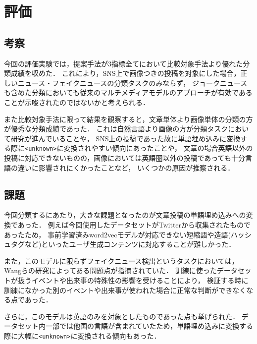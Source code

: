 \chapter{評価}

\section{考察}
今回の評価実験では，提案手法が3指標全てにおいて比較対象手法より優れた分類成績を収めた．
これにより，SNS上で画像つきの投稿を対象にした場合，正しいニュース・フェイクニュースの分類タスクのみならず，
ジョークニュースも含めた分類においても従来のマルチメディアモデルのアプローチが有効であることが示唆されたのではないかと考えられる．

また比較対象手法に限って結果を観察すると，文章単体より画像単体の分類の方が優秀な分類成績であった．
これは自然言語より画像の方が分類タスクにおいて研究が進んでいることや，
SNS上の投稿であった故に単語埋め込みに変換する際に\texttt{<unknown>}に変換されやすい傾向にあったことや，
文章の場合英語以外の投稿に対応できないものの，画像においては英語圏以外の投稿であっても十分言語の違いに影響されにくかったことなど，
いくつかの原因が推察される．

\section{課題}
今回分類するにあたり，大きな課題となったのが文章投稿の単語埋め込みへの変換であった．
例えば今回使用したデータセットがTwitterから収集されたものであったため，
事前学習済みword2vecモデルが対応できない短縮語や造語(ハッシュタグなど)といったユーザ生成コンテンツに対応することが難しかった．

また，このモデルに限らずフェイクニュース検出というタスクにおいては，Wangらの研究\cite{wang2018eann}によってある問題点が指摘されていた．
訓練に使ったデータセットが扱うイベントや出来事の特殊性の影響を受けることにより，
検証する時に訓練になかった別のイベントや出来事が使われた場合に正常な判断ができなくなる点であった．

さらに，このモデルは英語のみを対象としたものであった点も挙げられた．
データセット内一部では他国の言語が含まれていたため，単語埋め込みに変換する際に大幅に\texttt{<unknown>}に変換される傾向もあった．
%